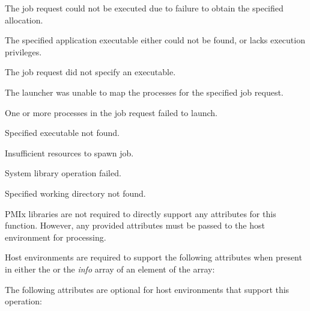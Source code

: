 \returnstart
\begin{constantdesc}
\item {} The job request could not be executed due to failure to obtain the specified allocation.
\item {} The specified application executable either could not be found, or lacks execution privileges.
\item {} The job request did not specify an executable.
\item {} The launcher was unable to map the processes for the specified job request.
\item {} One or more processes in the job request failed to launch.
\item {} Specified executable not found.
\item {} Insufficient resources to spawn job.
\item {} System library operation failed.
\item {} Specified working directory not found.
\end{constantdesc}
\returnend

\reqattrstart
\ac{PMIx} libraries are not required to directly support any attributes for this function. However, any provided attributes must be passed to the host environment for processing.

Host environments are required to support the following attributes when present in either the  or the \textit{info} array of an element of the  array:


\reqattrend

\optattrstart
The following attributes are optional for host environments that support this operation:

